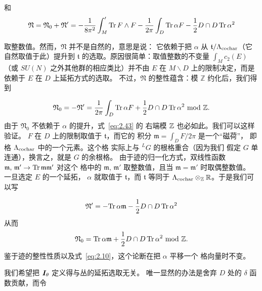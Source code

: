 和
\setcounter{equation}{41}
\begin{equation}\label{eq:2.42}
  {\mathfrak{N}}={\mathfrak{N}}_0+{\mathfrak{N}}' =-{1\over
8\pi^2}\int'_M{\rm Tr}\,F\wedge F-{1\over 2\pi}\int_D {\rm Tr} \,\alpha
F-{1\over 2}D\cap D\,{\rm Tr}\,\alpha^2
\end{equation}

 取整数值。然而，${\mathfrak{N}}$ 并不是自然的，意思是说：
它依赖于把 $\alpha$ 从 ${\mathfrak t}/
\Lambda_{\rm cochar}$（它自然取值于此）提升到 $\mathfrak
t$ 的选取。原因很简单：取值整数的不变量
$\int_M c_2(E)$（或 $SU(N)$ 之外其他群的相应类比）并不由 $E$ 在
$M\backslash D$ 上的限制决定，而是依赖于 $E$ 在 $D$ 上延拓方式的选取。
不过，$\mathfrak{N}$ 的整性蕴含：模 $\mathbb{Z}$ 约化后，我们得到

\setcounter{equation}{42}
\begin{equation}\label{eq:2.43}
  {\mathfrak{N}}_0=-{\mathfrak{N}}'={1\over 2\pi}\int_D {\rm Tr}\,\alpha
F+{1\over 2}D\cap D\,{\rm Tr}\,\alpha^2~{\rm mod}~\mathbb{Z}.
\end{equation}
 由于 ${\mathfrak{N}}_0$ 不依赖于 $\alpha$ 的提升，式~\eqref{eq:2.43} 的
右端模 ${\mathbb{Z}}$ 也必如此。我们可以这样验证。
$F$ 在 $D$ 上的限制取值于 ${\mathfrak t}$，而它的
积分 ${\mathfrak{m}}=\int_D F/2\pi$ 是一个“磁荷”，
即格 $\Lambda_{\rm cochar}$ 中的一个元素。这个格
实际上与 $^LG$ 的根格重合（因为我们
假定 $G$ 单连通），换言之，就是 $G$ 的余根格。
由于迹的归一化方式，双线性函数 ${\mathfrak{m}},\,{\mathfrak{m}}'\to {\rm Tr}\,{\mathfrak{m}}{\mathfrak{m}}'$ 对这个
格中的 ${\mathfrak{m}},\,{\mathfrak{m}}'$ 取整数值，且当 ${\mathfrak{m}}={\mathfrak{m}}'$ 时取偶整数值。
一旦选定 $E$ 的一个延拓，
$\alpha$ 就取值于 $\mathfrak t$，而 $\mathfrak t$ 等同于
$\Lambda_{\rm cochar} \otimes_{\mathbb{Z}}{\mathbb{R}}$。于是我们可以写

\setcounter{equation}{43}
\begin{equation}\label{eq:2.44}
  {\mathfrak{N}}'=-{\rm Tr}\,\alpha{\mathfrak{m}} -{1\over 2}D\cap
D\,{\rm Tr}\,\alpha^2
\end{equation}
 从而
\setcounter{equation}{44}
\begin{equation}\label{eq:2.45}
  {\mathfrak{N}}_0={\rm Tr}\,\alpha{\mathfrak{m}}+{1\over 2}D\cap D\,{\rm Tr}\,\alpha^2~{\rm
mod}~{\mathbb{Z}}.
\end{equation}
 鉴于迹的整性性质以及式~\eqref{eq:2.10}，这个论断在把 $\alpha$ 平移一个
格向量时不变。

我们希望把 $\bm{I}_\theta$ 定义得与丛的延拓选取无关。
唯一显然的办法是舍弃 $D$ 处的 $\delta$ 函数贡献，而令

